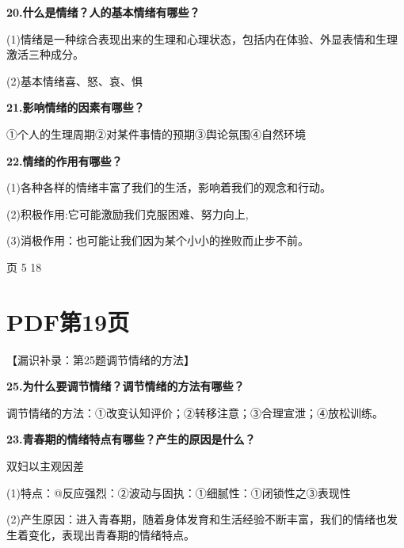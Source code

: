 \documentclass[lang=cn,11pt]{elegantbook}
\newcommand{\daofasym}[1]{{\daofasymbolfont #1}}
\newcommand{\daofasym}[1]{#1}
\begin{document}
\textbf{20.什么是情绪？人的基本情绪有哪些？}\par

(1)情绪是一种综合表现出来的生理和心理状态，包括内在体验、外显表情和生理激活三种成分。\par

(2)基本情绪喜、怒、哀、惧\par

\textbf{21.影响情绪的因素有哪些？}\par

\daofasym{①}个人的生理周期\daofasym{②}对某件事情的预期\daofasym{③}舆论氛围\daofasym{④}自然环境\par

\textbf{22.情绪的作用有哪些？}\par

(1)各种各样的情绪丰富了我们的生活，影响着我们的观念和行动。\par

(2)积极作用:它可能激励我们克服困难、努力向上,\par

(3)消极作用：也可能让我们因为某个小小的挫败而止步不前。\par

页 5 18\par


\section*{PDF第19页}

【漏识补录：第25题调节情绪的方法】\par

\textbf{25.为什么要调节情绪？调节情绪的方法有哪些？}\par

调节情绪的方法：\daofasym{①}改变认知评价；\daofasym{②}转移注意；\daofasym{③}合理宣泄；\daofasym{④}放松训练。\par

\textbf{23.青春期的情绪特点有哪些？产生的原因是什么？}\par

双妇以主观因差\par

(1)特点：@反应强烈：\daofasym{②}波动与固执：\daofasym{①}细腻性：\daofasym{①}闭锁性之\daofasym{③}表现性\par

(2)产生原因：进入青春期，随着身体发育和生活经验不断丰富，我们的情绪也发生着变化，表现出青春期的情绪特点。\par
\end{document}
